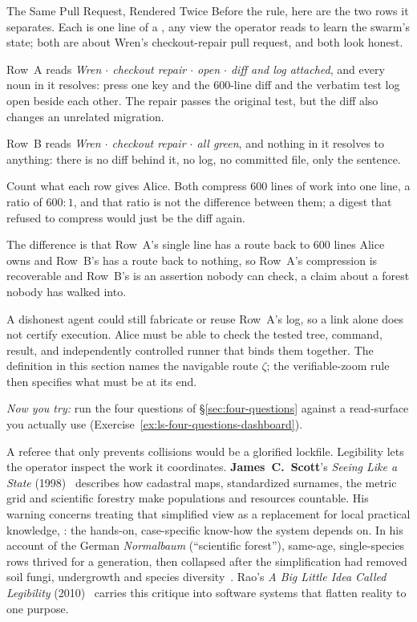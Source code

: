 \documentclass[11pt,a4paper]{article}
\theoremstyle{definition}
\theoremstyle{plain}
\begin{document}
\begin{pdexample}{The Same Pull Request, Rendered Twice}
\setlength{\parskip}{4pt plus 1pt}
Before the rule, here are the two rows it separates. Each is one line of a , any view the operator reads to learn the swarm's state; both are about Wren's checkout-repair pull request, and both look honest.

Row~A reads \emph{Wren $\cdot$ checkout repair $\cdot$ open $\cdot$ diff and log attached}, and every noun in it resolves: press one key and the $600$-line diff and the verbatim test log open beside each other. The repair passes the original test, but the diff also changes an unrelated migration.

Row~B reads \emph{Wren $\cdot$ checkout repair $\cdot$ all green}, and nothing in it resolves to anything: there is no diff behind it, no log, no committed file, only the sentence.

Count what each row gives Alice. Both compress $600$ lines of work into one line, a ratio of $600{:}1$, and that ratio is not the difference between them; a digest that refused to compress would just be the diff again.

The difference is that Row~A's single line has a route back to $600$ lines Alice owns and Row~B's has a route back to nothing, so Row~A's compression is recoverable and Row~B's is an assertion nobody can check, a claim about a forest nobody has walked into.

A dishonest agent could still fabricate or reuse Row~A's log, so a link alone does not certify execution. Alice must be able to check the tested tree, command, result, and independently controlled runner that binds them together. The definition in this section names the navigable route $\zeta$; the verifiable-zoom rule then specifies what must be at its end.

\emph{Now you try:} run the four questions of \S\ref{sec:four-questions} against a read-surface you actually use (Exercise~\ref{ex:ls-four-questions-dashboard}).
\end{pdexample}

%
A referee that only prevents collisions would be a glorified lockfile. Legibility
lets the operator inspect the work it coordinates. \textbf{James~C.\ Scott}'s
\emph{Seeing Like a State} (1998)~ describes how cadastral maps,
standardized surnames, the metric grid and scientific forestry make populations
and resources countable. His warning concerns treating that simplified view as a
replacement for local practical knowledge, : the hands-on,
case-specific know-how the system depends on. In his account of the German
\emph{Normalbaum} (``scientific forest''), same-age, single-species rows thrived
for a generation, then collapsed after the simplification had removed soil fungi,
undergrowth and species diversity~. Rao's \emph{A Big Little Idea
Called Legibility} (2010)~ carries this critique into software
systems that flatten reality to one purpose.
\end{document}
